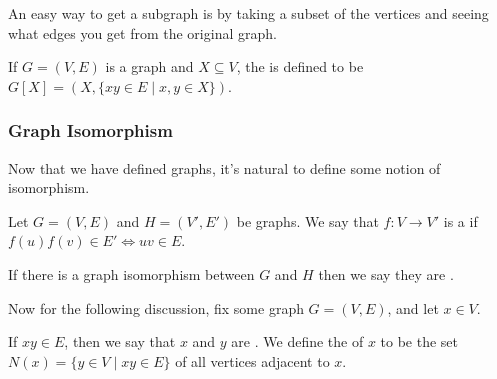\documentclass[a4paper]{scrartcl}
\begin{document}
An easy way to get a subgraph is by taking a subset of the vertices and seeing what edges you get from the original graph.

\begin{definition}
	If $G = (V, E)$ is a graph and $X \subseteq V$, the  is defined to be $G[X] = (X, \{xy \in E \mid x, y \in X\})$.
\end{definition}

\subsubsection{Graph Isomorphism}

Now that we have defined graphs, it's natural to define some notion of isomorphism.

\begin{definition}
	Let $G = (V, E)$ and $H = (V', E')$ be graphs. We say that $f : V \rightarrow V'$ is a  if $f(u)f(v) \in E' \iff uv \in E$. 

	If there is a graph isomorphism between $G$ and $H$ then we say they are .
\end{definition}

Now for the following discussion, fix some graph $G = (V, E)$, and let $x \in V$. 

\begin{definition}[Neighbourhood]
	If $xy \in E$, then we say that $x$ and $y$ are .
	We define the  of $x$ to be the set $N(x) = \{ y \in V \mid xy \in E\}$ of all vertices adjacent to $x$.
\end{definition}
\end{document}
